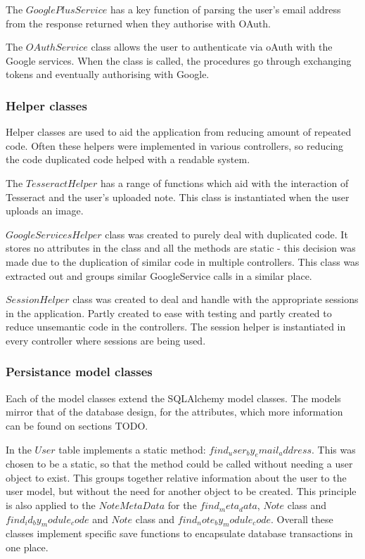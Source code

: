 The $GooglePlusService$ has a key function of parsing the user's email address from the response returned when they authorise with OAuth.

The $OAuthService$ class allows the user to authenticate via oAuth with the Google services. When the class is called, the procedures go through exchanging tokens and eventually authorising with Google.

\subsubsection{Helper classes}
Helper classes are used to aid the application from reducing amount of repeated code. Often these helpers were implemented in various controllers, so reducing the code duplicated code helped with a readable system.

The $TesseractHelper$ has a range of functions which aid with the interaction of Tesseract and the user's uploaded note. This class is instantiated when the user uploads an image.

$GoogleServicesHelper$ class was created to purely deal with duplicated code. It stores no attributes in the class and all the methods are static - this decision was made due to the duplication of similar code in multiple controllers. This class was extracted out and groups similar GoogleService calls in a similar place.

$SessionHelper$ class was created to deal and handle with the appropriate sessions in the application. Partly created to ease with testing and partly created to reduce unsemantic code in the controllers. The session helper is instantiated in every controller where sessions are being used.


\subsubsection{Persistance model classes}
Each of the model classes extend the SQLAlchemy model classes. The models mirror that of the database design, for the attributes, which more information can be found on sections TODO.

In the $User$ table implements a static method: $find_user_by_email_address$. This was chosen to be a static, so that the method could be called without needing a user object to exist. This groups together relative information about the user to the user model, but without the need for another object to be created. This principle is also applied to the $NoteMetaData$ for the $find_meta_data$, $Note$ class and $find_id_by_module_code$ and $Note$ class and $find_note_by_module_code$. Overall these classes implement specific save functions to encapsulate database transactions in one place.

